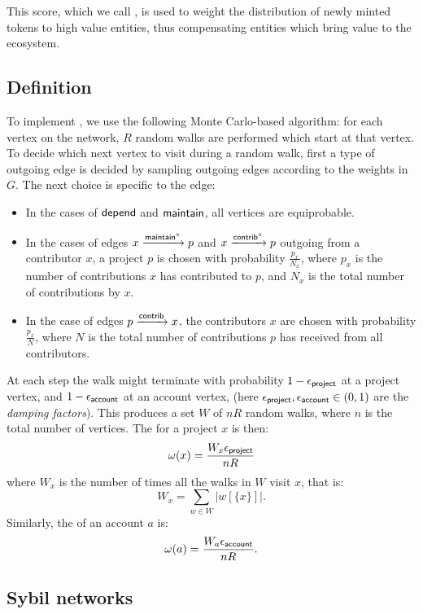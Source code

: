 This score, which we call \osrank{}, is used to weight the
distribution of newly minted tokens to high value entities, thus
compensating entities which bring value to the ecosystem.

\subsection{Definition}

To implement \osrank{}, we use the following Monte Carlo-based algorithm: for
each vertex on the network, $R$ random walks are performed which start at that
vertex. To decide which next vertex to visit during a random walk, first a type
of outgoing edge is decided by sampling outgoing edges according to the weights
in $G$. The next choice is specific to the edge:

\begin{itemize}
\item In the cases of $\mathsf{depend}$ and $\mathsf{maintain}$, all vertices are equiprobable.
\item In the cases of edges $x \xrightarrow[]{\mathsf{maintain}^\circ} p$ and
  $x \xrightarrow[]{\mathsf{contrib}^\circ} p$ outgoing from a contributor $x$, a project $p$ is
  chosen with probability $\frac{p_x}{N_x}$, where $p_x$ is the number of
  contributions $x$ has contributed to $p$, and $N_x$ is the total number of
  contributions by $x$.
\item In the case of edges $p \xrightarrow[]{\mathsf{contrib}} x$, the contributors $x$ are
  chosen with probability $\frac{p_x}{N}$, where $N$ is the total number of
  contributions $p$ has received from all contributors.
\end{itemize}

\noindent At each step the walk might terminate with probability $1 - \epsilon_{\mathsf{project}}$ at a
project vertex, and $1 - \epsilon_{\mathsf{account}}$ at an account vertex, (here
$\epsilon_{\mathsf{project}}, \epsilon_{\mathsf{account}} \in (0,1)$ are the \emph{damping factors}). This
produces a set $W$ of $nR$ random walks, where $n$ is the total number of
vertices. The \osrank{} for a project $x$ is then:
\[
  \omega(x) = \frac{W_x \epsilon_{\mathsf{project}}}{n R}
\]
where $W_x$ is the number of times all the walks in $W$ visit $x$, that is:
\[
  W_x = \sum_{w \in W} |w[\{x\}]|.
\]
Similarly, the \osrank{} of an account $a$ is:
\[
  \omega(a) = \frac{W_a \epsilon_{\mathsf{account}}}{n R}.
\]

\subsection{Sybil networks}

